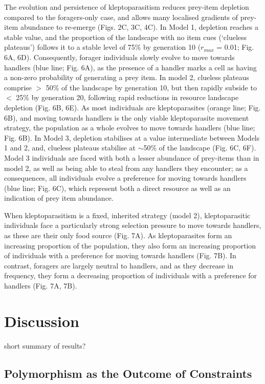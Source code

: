\documentclass[11pt]{article}
\begin{document}
The evolution and persistence of kleptoparasitism reduces prey-item depletion compared to the foragers-only case, and allows many localised gradients of prey-item abundance to re-emerge (Figs. 2C, 3C, 4C).
In Model 1, depletion reaches a stable value, and the proportion of the landscape with no item cues (`clueless plateaus') follows it to a stable level of 75\% by generation 10 ($r_{max}$ = 0.01; Fig. 6A, 6D).
Consequently, forager individuals slowly evolve to move towards handlers (blue line; Fig. 6A), as the presence of a handler marks a cell as having a non-zero probability of generating a prey item.
%
In model 2, clueless plateaus comprise $>$ 50\% of the landscape by generation 10, but then rapidly subside to $<$ 25\% by generation 20, following rapid reductions in resource landscape depletion (Fig. 6B, 6E).
As most individuals are kleptoparasites (orange line; Fig. 6B), and moving towards handlers is the only viable kleptoparasite movement strategy, the population as a whole evolves to move towards handlers (blue line; Fig. 6B).
In Model 3, depletion stabilises at a value intermediate between Models 1 and 2, and, clueless plateaus stabilise at $\sim$50\% of the landscape (Fig. 6C, 6F).
Model 3 individuals are faced with both a lesser abundance of prey-items than in model 2, as well as being able to steal from any handlers they encounter; as a consequences, all individuals evolve a preference for moving towards handlers (blue line; Fig. 6C), which represent both a direct resource as well as an indication of prey item abundance.

When kleptoparasitism is a fixed, inherited strategy (model 2), kleptoparasitic individuals face a particularly strong selection pressure to move towards handlers, as these are their only food source (Fig. 7A).
As kleptoparasites form an increasing proportion of the population, they also form an increasing proportion of individuals with a preference for moving towards handlers (Fig. 7B).
In contrast, foragers are largely neutral to handlers, and as they decrease in frequency, they form a decreasing proportion of individuals with a preference for handlers (Fig. 7A, 7B).

\section{Discussion}

short summary of results?

\subsection{Polymorphism as the Outcome of Constraints}
\end{document}
